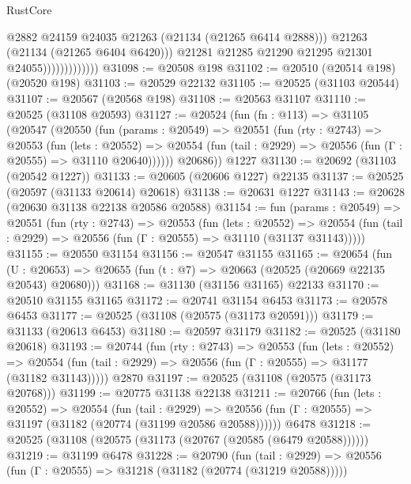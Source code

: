 \begin{lexlean}{RustCore}
\begin{coremodule}
                                  @2882
                                  @24159
                                  @24035
                                  @21263
                                  (@21134 (@21265 @6414 @2888)))
                                @21263
                                (@21134 (@21265 @6404 @6420)))
                              @21281
                              @21285
                              @21290
                              @21295
                              @21301
                              @24055)))))))))))))
@31098 := @20508 @198
@31102 := @20510 (@20514 @198) (@20520 @198)
@31103 := @20529 @22132
@31105 := @20525 (@31103 @20544)
@31107 := @20567 (@20568 @198)
@31108 := @20563 @31107
@31110 := @20525 (@31108 @20593)
@31127 := @20524
    (fun (fn : @113) =>
    @31105
      (@20547
        (@20550
          (fun (params : @20549) =>
          @20551
            (fun (rty : @2743) =>
            @20553
              (fun (lets : @20552) =>
              @20554 (fun (tail : @2929) => @20556 (fun (Γ : @20555) => @31110 @20640))))))
        @20686))
    @1227
@31130 := @20692 (@31103 (@20542 @1227))
@31133 := @20605 (@20606 @1227) @22135
@31137 := @20525 (@20597 (@31133 @20614) @20618)
@31138 := @20631 @1227
@31143 := @20628 (@20630 @31138 @22138 @20586 @20588)
@31154 := fun (params : @20549) =>
  @20551
    (fun (rty : @2743) =>
    @20553
      (fun (lets : @20552) =>
      @20554 (fun (tail : @2929) => @20556 (fun (Γ : @20555) => @31110 (@31137 @31143)))))
@31155 := @20550 @31154
@31156 := @20547 @31155
@31165 := @20654
    (fun (U : @20653) => @20655 (fun (t : @7) => @20663 (@20525 (@20669 @22135 @20543) @20680)))
@31168 := @31130 (@31156 @31165) @22133
@31170 := @20510 @31155 @31165
@31172 := @20741 @31154 @6453
@31173 := @20578 @6453
@31177 := @20525 (@31108 (@20575 (@31173 @20591)))
@31179 := @31133 (@20613 @6453)
@31180 := @20597 @31179
@31182 := @20525 (@31180 @20618)
@31193 := @20744
    (fun (rty : @2743) =>
    @20553
      (fun (lets : @20552) =>
      @20554 (fun (tail : @2929) => @20556 (fun (Γ : @20555) => @31177 (@31182 @31143)))))
    @2870
@31197 := @20525 (@31108 (@20575 (@31173 @20768)))
@31199 := @20775 @31138 @22138
@31211 := @20766
    (fun (lets : @20552) =>
    @20554
      (fun (tail : @2929) =>
      @20556 (fun (Γ : @20555) => @31197 (@31182 (@20774 (@31199 @20586 @20588))))))
    @6478
@31218 := @20525 (@31108 (@20575 (@31173 (@20767 (@20585 (@6479 @20588))))))
@31219 := @31199 @6478
@31228 := @20790
    (fun (tail : @2929) => @20556 (fun (Γ : @20555) => @31218 (@31182 (@20774 (@31219 @20588)))))

\end{coremodule}
\end{lexlean}
